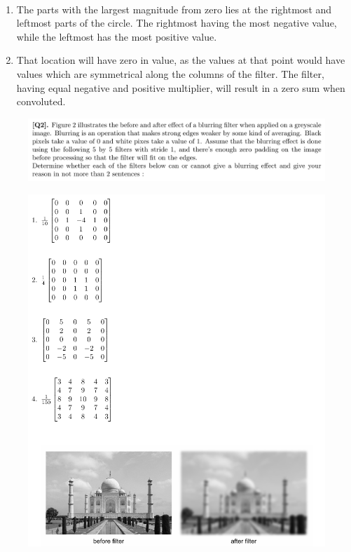 \documentclass[12pt]{article}
\newenvironment{solution}[2][Solution]{\begin{trivlist}
\item[\hskip \labelsep {\bfseries #1}]}{\end{trivlist}}
\begin{document}
\begin{solution}{}~
\begin{enumerate}
\item The parts with the largest magnitude from zero lies at the rightmost and leftmost parts of the circle. The rightmost having the most negative value, while the leftmost has the most positive value.
\item That location will have zero in value, as the values at that point would have values which are symmetrical along the columns of the filter. The filter, having equal negative and positive multiplier, will result in a zero sum when convoluted.
\end{enumerate}
\end{solution}

\begin{figure}[h!]
\includegraphics[width=\linewidth]{./assets/201806300415.png}
\end{figure}
\begin{figure}[h!]
\includegraphics[width=\linewidth]{./assets/201806300416.png}
\end{figure}
\end{document}
